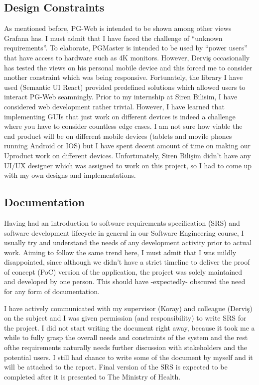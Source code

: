 \subsection{Design Constraints}

As mentioned before, PG-Web is intended to be shown among other views Grafana 
has. I must admit that I have faced the challenge of ``unknown requirements''. 
To elaborate, PGMaster is intended to be used by ``power users'' that have 
access to hardware such as 4K monitors. However, Derviş occasionally has 
tested the views on his personal mobile device and this forced me to consider 
another constraint which was being responsive. Fortunately, the library I have 
used (Semantic UI React) provided predefined solutions which allowed users to 
interact PG-Web seamningly. Prior to my internship at Siren Bilisim, I have 
considered web development rather trivial. However, I have learned that 
implementing GUIs that just work on different devices is indeed a challenge 
where you have to consider countless edge cases. I am not sure how viable the 
end product will be on different mobile devices (tablets and movile phones 
running Android or IOS) but I have spent decent amount of time on making our 
Uproduct work on different devices. Unfortunately, Siren Bilişim didn't have 
any UI/UX designer which was assigned to work on this project, so I had to 
come up with my own designs and implementations.

\subsection{Documentation}

Having had an introduction to software requirements specification (SRS) and 
software development lifecycle in general in our Software Engineering course, 
I usually try and understand the needs of any development activity prior to 
actual work. Aiming to follow the same trend here, I must admit that I was 
mildly disappointed, since although we didn't have a strict timeline to 
deliver the proof of concept (PoC) version of the application, the project 
was solely maintained and developed by one person. This should have 
-expectedly- obscured the need for any form of documentation.
\par I have actively communicated with my supervisor (Koray) and colleague 
(Derviş) on the subject and I was given permission (and responsibility) to 
write SRS for the project. I did not start writing the document right away, 
because it took me a while to fully grasp the overall needs and constraints 
of the system and the rest ofthe requirements naturally needs further 
discussion with stakeholders and the potential users. I still had chance to 
write some of the document by myself and it will be attached to the report. 
Final version of the SRS is expected to be completed after it is presented 
to The Ministry of Health.

